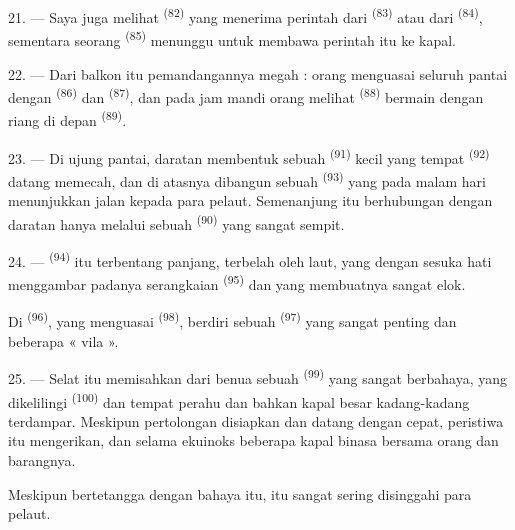 21. --- Saya juga melihat 
\textsuperscript{(82)} yang menerima perintah dari
 \textsuperscript{(83)} atau dari
 \textsuperscript{(84)}, sementara seorang
 \textsuperscript{(85)} menunggu untuk membawa
perintah itu ke kapal.

22. --- Dari balkon itu pemandangannya megah : orang menguasai seluruh
pantai dengan  \textsuperscript{(86)} dan  \textsuperscript{(87)}, dan pada jam mandi orang melihat
 \textsuperscript{(88)} bermain dengan
riang di depan  \textsuperscript{(89)}.

23. --- Di ujung pantai, daratan membentuk sebuah 
\textsuperscript{(91)} kecil yang  tempat
 \textsuperscript{(92)} datang memecah, dan di atasnya
dibangun sebuah  \textsuperscript{(93)} yang pada
malam hari menunjukkan jalan kepada para pelaut. Semenanjung itu
berhubungan dengan daratan hanya melalui sebuah 
\textsuperscript{(90)} yang sangat sempit.

\VUsaut{3.0mm}
\VUsaut{3.0mm}

24. ---  \textsuperscript{(94)} itu terbentang
panjang, terbelah oleh laut, yang dengan sesuka hati menggambar
padanya serangkaian  \textsuperscript{(95)} dan
 yang membuatnya sangat elok.

Di  \textsuperscript{(96)}, yang menguasai
 \textsuperscript{(98)}, berdiri sebuah 
\textsuperscript{(97)} yang sangat penting dan beberapa « vila ».

25. --- Selat itu memisahkan dari benua sebuah 
\textsuperscript{(99)} yang sangat berbahaya, yang dikelilingi
 \textsuperscript{(100)} dan 
tempat perahu dan bahkan kapal besar kadang-kadang terdampar. Meskipun
pertolongan disiapkan dan  datang dengan cepat,
peristiwa  itu mengerikan, dan selama 
ekuinoks beberapa kapal binasa bersama orang dan barangnya.

Meskipun bertetangga dengan bahaya itu,  itu sangat
sering disinggahi para pelaut.

\VUsaut{6.0mm}
\VUfilet{22mm}
